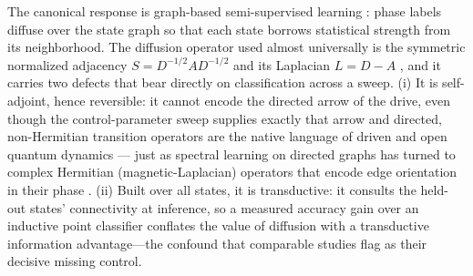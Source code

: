 \documentclass[aps,prresearch,reprint,amsmath,amssymb,nofootinbib,superscriptaddress,floatfix]{revtex4-2}
\theoremstyle{definition}
\theoremstyle{remark}
\theoremstyle{plain}
\begin{document}
The canonical response is graph-based semi-supervised learning
\cite{zhu2002labelprop,zhou2004local,kipf2017gcn,scarselli2009gnn,belkin2006manifold}: phase labels diffuse over the state graph so that each state borrows
statistical strength from its neighborhood. The diffusion operator used almost universally is the symmetric
normalized adjacency $S=D^{-1/2}AD^{-1/2}$ and its Laplacian $L=D-A$ \cite{coifman2006diffusion}, and it
carries two defects that bear directly on classification across a sweep. (i) It is self-adjoint, hence
reversible: it cannot encode the directed arrow of the drive, even though the control-parameter sweep
supplies exactly that arrow and directed, non-Hermitian transition operators are the native language of
driven and open quantum dynamics \cite{chung2005directed,ashida2020nonhermitian,sachdev2011qpt,bergholtz2021exceptional}---
just as spectral learning on directed graphs has turned to complex Hermitian (magnetic-Laplacian) operators
that encode edge orientation in their phase \cite{zhang2021magnet}. (ii)
Built over all states, it is transductive: it consults the held-out states' connectivity at inference, so a
measured accuracy gain over an inductive point classifier conflates the value of diffusion with a
transductive information advantage---the confound that comparable studies flag as their decisive missing
control.
\end{document}
